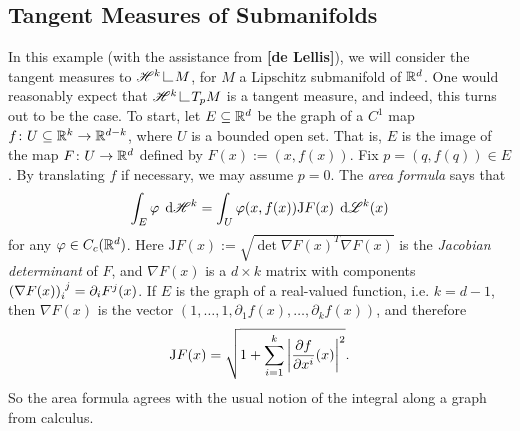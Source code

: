 \subsection{Tangent Measures of Submanifolds} \label{sec:submanifolds}
In this example (with the assistance from {\bf [de Lellis]}), we will consider the tangent measures to $\scrH^k \restrict M$, for $M$ a Lipschitz submanifold of $\mathbb{R}^d$. One would reasonably expect that $\scrH^k \restrict T_{p}M$ is a tangent measure, and indeed, this turns out to be the case. To start, let $E \subseteq \mathbb{R}^d$ be the graph of a $C^1$ map $f \colon U \subseteq \mathbb{R}^{k} \to \mathbb{R}^{d-k}$, where $U$ is a bounded open set. That is, $E$ is the image of the map $F \colon U \to \mathbb{R}^{d}$ defined by $F(x) := (x,f(x))$. Fix $p = (q,f(q)) \in E$. By translating $f$ if necessary, we may assume $p = 0$. The \textit{area formula} says that 
\begin{equation} \label{eq:areaFormula}
    \int_E \varphi \; \operatorname{d}\!{\mathscr{H}}^k = \int_{U} \varphi(x,f(x)) \mathrm{J}F(x) \; \operatorname{d}\!{\mathscr{L}}^k(x)
\end{equation}
for any $\varphi \in C_c(\mathbb{R}^d)$. Here $\mathrm{J}F(x) := \sqrt{\det{\nabla F(x)^T \nabla F(x)}}$ is the \textit{Jacobian determinant} of $F$, and $\nabla F(x)$ is a $d \times k$ matrix with components $\tensor{(\nabla F(x))}{_i^j} = \partial_i F^j(x)$. If $E$ is the graph of a real-valued function, i.e. $k = d-1$, then $\nabla F(x)$ is the vector $(1,\dots,1,\partial_1 f(x),\dots,\partial_k f(x))$, and therefore 
\begin{equation}
    \mathrm{J}F(x) = \sqrt{1 + \sum_{i=1}^k \left\vert { \frac{\partial f}{\partial x^i}(x) } \right\vert^2}.
\end{equation}
So the area formula agrees with the usual notion of the integral along a graph from calculus.

